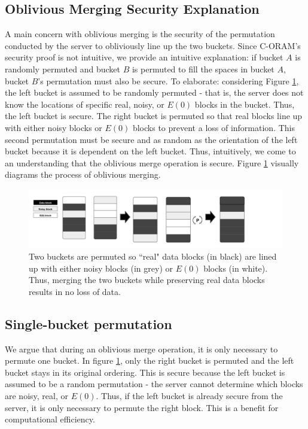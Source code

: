 \documentclass[12pt, oneside]{article}   	%
\begin{document}
\subsection{Oblivious Merging Security Explanation}
A main concern with oblivious merging is the security of the permutation conducted by the server to obliviously line up the two buckets. Since C-ORAM's security proof is not intuitive, we provide an intuitive explanation: if bucket $A$ is randomly permuted and bucket $B$ is permuted to fill the spaces in bucket $A$, bucket $B$'s permutation must also be secure. To elaborate: considering Figure \ref{fig:merge}, the left bucket is assumed to be randomly permuted - that is, the server does not know the locations of specific real, noisy, or $E (0)$ blocks in the bucket. Thus, the left bucket is secure. The right bucket is permuted so that real blocks line up with either noisy blocks or $E (0)$ blocks to prevent a loss of information. This second permutation must be secure and as random as the orientation of the left bucket because it is dependent on the left bucket. Thus, intuitively, we come to an understanding that the oblivious merge operation is secure. Figure \ref{fig:merge} visually diagrams the process of oblivious merging.
\begin{figure}[h!]
  \includegraphics[width=\linewidth]{merge}
  \caption{Two buckets are permuted so ``real" data blocks (in black) are lined up with either noisy blocks (in grey) or $E (0)$ blocks (in white). Thus, merging the two buckets while preserving real data blocks results in no loss of data.}
  \label{fig:merge}
\end{figure}

\subsection{Single-bucket permutation}
We argue that during an oblivious merge operation, it is only necessary to permute one bucket. In figure \ref{fig:merge}, only the right bucket is permuted and the left bucket stays in its original ordering. This is secure because the left bucket is assumed to be a random permutation - the server cannot determine which blocks are noisy, real, or $ E (0) $. Thus, if the left bucket is already secure from the server, it is only necessary to permute the right block. This is a benefit for computational efficiency. 
\end{document}
